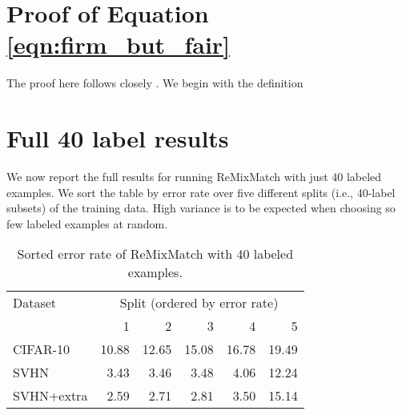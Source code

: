 \documentclass{article} \usepackage{iclr2020_conference,times}
\begin{document}



\appendix

\newpage
\section{Proof of Equation \ref{eqn:firm_but_fair}}
The proof here follows closely \cite{bridle1992unsupervised}. 
We begin with the definition


\section{Full 40 label results}
We now report the full results for running ReMixMatch with
just 40 labeled examples. We sort the table by error rate
over five different splits (i.e., 40-label subsets) of the
training data.
High variance is to be expected when choosing so few labeled examples at random.

\begin{table}[h!]
\centering
\begin{tabular}{lrrrrr}
\toprule
Dataset & \multicolumn{5}{c}{Split (ordered by error rate)} \\
 & 1 & 2 & 3 & 4 & 5 \\ 
\midrule
CIFAR-10 & 10.88 & 12.65 & 15.08 & 16.78 & 19.49 \\
SVHN & 3.43 & 3.46 & 3.48 & 4.06 & 12.24 \\
SVHN+extra & 2.59 & 2.71 & 2.81 & 3.50 & 15.14 \\
\bottomrule
\end{tabular}
\caption{Sorted error rate of ReMixMatch with 40 labeled examples.}
\end{table}

\newpage
\end{document}
